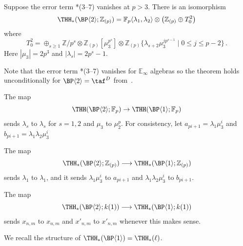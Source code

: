 \begin{theorem}\label{thm:BP2-coeff}
Suppose the error term \cite{ACH24}*{(3--7)} vanishes at $p>3$. There is an isomorphism 
\[ 
\THH_*(\BP\langle 2\rangle ;\mathbb{Z}_{(p)})=\mathbb{F}_p\langle \lambda_1 ,\lambda_2\rangle \otimes \left ( \mathbb{Z}_{(p)}\oplus T_0^2 \right )
\]
where 
\[ T_0^2 = \oplus_{s\ge 1} \mathbb{Z}/p^s\otimes \mathbb{Z}_{(p)}[\mu_3^{p^s}]\otimes \mathbb{Z}_{(p)}\{\lambda_{s+2}\mu_3^{jp^{s-1}} \mid 0\le j\le p-2 \} \,. 
\]
Here $|\mu_3|=2p^3$ and $|\lambda_{s}|=2p^{s}-1$. 
\end{theorem}
Note that the error term \cite{ACH24}*{(3--7)} vanishes for $\mathbb{E}_\infty$ algebras so the theorem holds unconditionally for $\BP\langle 2\rangle=\taf^{D}$ from~\cite{HL10}. 

The map 
\[ 
  \THH(\BP\langle 2\rangle ; \mathbb{F}_p)\to  \THH(\BP\langle 1\rangle ; \mathbb{F}_p) 
\]
sends $\lambda_s$ to $\lambda_s$ for $s=1,2$ and $\mu_3$ to $\mu_2^p$. For consistency, let $a_{pi+1}=\lambda_1\mu_3^{i}$ and $b_{pi+1}=\lambda_1\lambda_2\mu_3^{i}$ 

\begin{corollary}
  The map 
  \[ 
    \THH_*(\BP\langle 2\rangle ;\mathbb{Z}_{(p)})\longrightarrow \THH_*(\BP\langle 1\rangle ;\mathbb{Z}_{(p)})
  \]
  sends $\lambda_1$ to $\lambda_1$, and it sends $\lambda_1\mu_3^i$ to $a_{pi+1}$ and $\lambda_1\lambda_2\mu_3^i$ to $b_{pi+1}$. 

  The map 
  \[ 
    \THH_*(\BP\langle 2\rangle ;k(1))\longrightarrow \THH_*(\BP\langle 1\rangle ;k(1))
  \]
  sends $x_{n,m}$ to $x_{n,m}$ and $x'_{n,m}$ to $x'_{n,m}$ whenever this makes sense.
\end{corollary}



We recall the structure of $\THH_*(\BP \langle 1 \rangle) = \THH_*(\ell)$.

